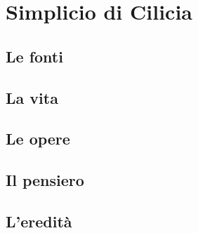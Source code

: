 \chapter{Simplicio di Cilicia}

\section{Le fonti}

\section{La vita}

\section{Le opere}

\section{Il pensiero}

\section{L'eredità}
